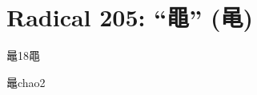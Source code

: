 
\section*{Radical 205: ``⿌'' (黾)}

\begin{entry}{鼂}{18}{⿌}
  \begin{phonetics}{鼂}{chao2}
  \end{phonetics}
\end{entry}


